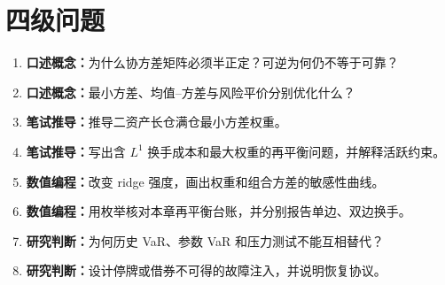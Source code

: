 \section{四级问题}
\begin{enumerate}[leftmargin=*]
  \item \textbf{口述概念：}为什么协方差矩阵必须半正定？可逆为何仍不等于可靠？
  \item \textbf{口述概念：}最小方差、均值--方差与风险平价分别优化什么？
  \item \textbf{笔试推导：}推导二资产长仓满仓最小方差权重。
  \item \textbf{笔试推导：}写出含 $L^1$ 换手成本和最大权重的再平衡问题，并解释活跃约束。
  \item \textbf{数值编程：}改变 ridge 强度，画出权重和组合方差的敏感性曲线。
  \item \textbf{数值编程：}用枚举核对本章再平衡台账，并分别报告单边、双边换手。
  \item \textbf{研究判断：}为何历史 VaR、参数 VaR 和压力测试不能互相替代？
  \item \textbf{研究判断：}设计停牌或借券不可得的故障注入，并说明恢复协议。
\end{enumerate}
